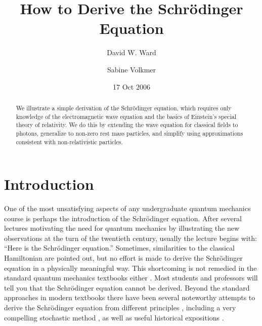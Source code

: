 \documentclass[preprint,footinbib,preprintnumbers,amsmath,amssymb,prb,12pt]{revtex4}
\begin{document}


\title{How to Derive the Schr\"{o}dinger Equation}


\author{David W. Ward}
 

\author{Sabine Volkmer}

\date{ 17 Oct 2006 }%

\begin{abstract}
We illustrate a simple derivation of the Schr\"{o}dinger equation,
which requires only knowledge of the electromagnetic wave equation
and the basics of Einstein's special theory of relativity. We do
this by extending the wave equation for classical fields to photons,
generalize to non-zero rest mass particles, and simplify using
approximations consistent with non-relativistic particles.
\end{abstract}

\maketitle

\section{Introduction}

One of the most unsatisfying aspects of any undergraduate quantum
mechanics course is perhaps the introduction of the Schr\"{o}dinger
equation. After several lectures motivating the need for quantum
mechanics by illustrating the new observations at the turn of the
twentieth century, usually the lecture begins with: ``Here is the
Schr\"{o}dinger equation.'' Sometimes, similarities to the classical
Hamiltonian are pointed out, but no effort is made to derive the
Schr\"{o}dinger equation in a physically meaningful way. This shortcoming is not remedied in the standard quantum mechanics textbooks either \cite{griffiths,merzbacher, sakurai}. Most students and professors will tell you that the Schr\"{o}dinger equation cannot be derived.  Beyond the standard approaches in modern textbooks there have been several noteworthy attempts to derive the Schr\"{o}dinger equation from different principles \cite{hall, peice, field, ogborn}, including a very compelling stochastic method \cite{nelson}, as well as useful historical expositions \cite{bernstein}.
\end{document}
